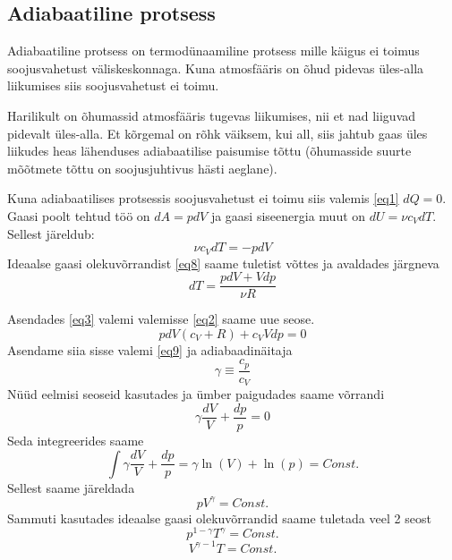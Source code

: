 \documentclass{trkut}%
\begin{document}
\subsection{Adiabaatiline protsess}
Adiabaatiline protsess on termodünaamiline protsess mille käigus ei toimus soojusvahetust väliskeskonnaga. Kuna atmosfääris on õhud pidevas üles-alla liikumises siis soojusvahetust ei toimu.

Harilikult on õhumassid atmosfääris tugevas liikumises, nii et nad liiguvad pidevalt üles-alla. Et kõrgemal on rõhk väiksem, kui all, siis jahtub gaas üles liikudes heas lähenduses adiabaatilise paisumise tõttu (õhumasside suurte mõõtmete tõttu on soojusjuhtivus hästi aeglane).



Kuna adiabaatilises protsessis soojusvahetust ei toimu siis valemis \ref{eq1} $dQ=0$. Gaasi poolt tehtud töö on $d A=pdV$ ja gaasi siseenergia muut on $dU=\nu c_VdT$. Sellest järeldub:
\begin{equation}\label{eq2}
\nu c_VdT = -pdV
\end{equation}
Ideaalse gaasi olekuvõrrandist \ref{eq8} saame tuletist võttes ja avaldades järgneva
\begin{equation}\label{eq3}
dT = \frac{pdV+Vdp}{\nu R}
\end{equation}

Asendades \ref{eq3} valemi valemisse \ref{eq2} saame uue seose.
\begin{equation}\label{eq4}
pdV(c_V+R)+c_VVdp=0
\end{equation}
Asendame siia sisse valemi \ref{eq9} ja adiabaadinäitaja
\begin{equation}
\gamma \equiv \frac{c_p}{c_V}
\end{equation}
Nüüd eelmisi seoseid kasutades ja ümber paigudades saame võrrandi
\begin{equation}
\gamma \frac{dV}{V} + \frac{dp}{p} = 0
\end{equation}
Seda integreerides saame
\begin{equation}
 \int \gamma \frac{dV}{V} + \frac{dp}{p} = \gamma \ln(V) + \ln(p) = Const.
\end{equation}
Sellest saame järeldada
\begin{equation}
pV^\gamma = Const.
\end{equation}
Sammuti kasutades ideaalse gaasi olekuvõrrandid saame tuletada veel 2 seost
\begin{equation}\label{eq13}
p^{1-\gamma}T^\gamma = Const.
\end{equation}
\begin{equation}
V^{\gamma-1}T = Const.
\end{equation}
\end{document}

